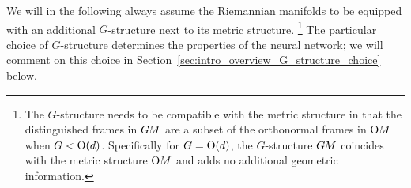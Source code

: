 We will in the following always assume the Riemannian manifolds to be equipped with an additional $G$-structure next to its metric structure.%
\footnote{
    The $G$-structure needs to be compatible with the metric structure in that the distinguished frames in $G\mkern-1.4muM$ are a subset of the orthonormal frames in $\operatorname{O}\mkern-3.6muM$ when $G<\operatorname{O}(d)$.
    Specifically for $G=\operatorname{O}(d)$, the $G$-structure $G\mkern-1.4muM$ coincides with the metric structure $\operatorname{O}\mkern-3.6muM$ and adds no additional geometric information.
}
The particular choice of $G$-structure determines the properties of the neural network; we will comment on this choice in Section~\ref{sec:intro_overview_G_structure_choice} below.





